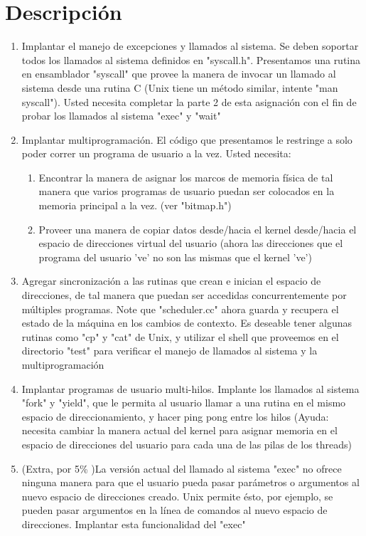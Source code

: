 \section[Descripción]{Descripción}
\begin{enumerate}
  \item Implantar el manejo de excepciones y llamados al sistema. Se deben soportar todos los llamados al sistema definidos en "syscall.h". Presentamos una rutina en ensamblador "syscall" que provee la manera de invocar un llamado al sistema desde una rutina C (Unix tiene un método similar, intente "man syscall"). Usted necesita completar la parte 2 de esta asignación con el fin de probar los llamados al sistema "exec" y "wait"
  \item Implantar multiprogramación. El código que presentamos le restringe a solo poder correr un programa de usuario a la vez. Usted necesita:
   \begin{enumerate}
     \item Encontrar la manera de asignar los marcos de memoria física de tal manera que varios programas de usuario puedan ser colocados en la memoria principal a la vez. (ver "bitmap.h")
     \item Proveer una manera de copiar datos desde/hacia el kernel desde/hacia el espacio de direcciones virtual del usuario (ahora las direcciones que el programa del usuario 've' no son las mismas que el kernel 've')
   \end{enumerate}       
   \item Agregar sincronización a las rutinas que crean e inician el espacio de direcciones, de tal manera que puedan ser accedidas concurrentemente por múltiples programas. Note que "scheduler.cc" ahora guarda y recupera el estado de la máquina en los cambios de contexto. Es deseable tener algunas rutinas como "cp" y "cat" de Unix, y utilizar el shell que proveemos en el directorio "test" para verificar el manejo de llamados al sistema y la multiprogramación
    \item Implantar programas de usuario multi-hilos. Implante los llamados al sistema "fork" y "yield", que le permita al usuario llamar a una rutina en el mismo espacio de direccionamiento, y hacer ping pong entre los hilos (Ayuda: necesita cambiar la manera actual del kernel para asignar memoria en el espacio de direcciones del usuario para cada una de las pilas de los threads)
    \item (Extra, por 5\% )La versión actual del llamado al sistema "exec" no ofrece ninguna manera para que el usuario pueda pasar parámetros o argumentos al nuevo espacio de direcciones creado. Unix permite ésto, por ejemplo, se pueden pasar argumentos en la línea de comandos al nuevo espacio de direcciones. Implantar esta funcionalidad del "exec"
\end{enumerate}
